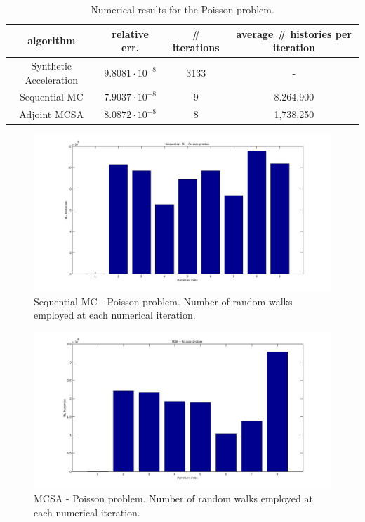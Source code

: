 \begin{table}[!h]
\centering
\hspace*{-0.8cm}
\begin{tabular}{|c|c|c|c|}
\hline
algorithm & relative err.& \# iterations & average \# histories per iteration\\
\hline
Synthetic Acceleration & $9.8081\cdot 10^{-8}$ & 3133 & - \\
\hline
Sequential MC & $7.9037 \cdot 10^{-8}$ & 9 & 8.264,900\\
\hline
 Adjoint MCSA & $8.0872\cdot 10^{-8}$ & 8 & 1,738,250\\
\hline
\end{tabular}
\caption{Numerical results for the Poisson problem.}
\label{Poisson_results}
\end{table}


\begin{figure}[h!]
  \centering
    \includegraphics[width=\textwidth]{SEQ_poisson.jpg}
    \caption{Sequential MC - Poisson problem. Number of random walks employed
at each numerical iteration.}
\label{SEQ_poisson}
\end{figure}


\begin{figure}[h!]
  \centering
    \includegraphics[width=\textwidth]{MCSA_poisson.jpg}
      \caption{MCSA - Poisson problem. Number of random walks employed at each
numerical iteration.}
\label{MCSA_poisson}
\end{figure}

